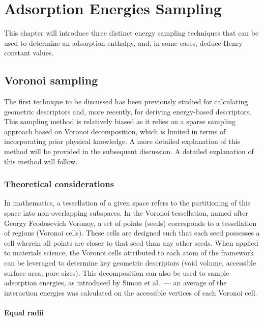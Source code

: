 \documentclass[main]{subfiles}
\begin{document}
\chapter{Adsorption Energies Sampling}
\vspace*{-1\baselineskip}

This chapter will introduce three distinct energy sampling techniques that can be used to determine an adsorption enthalpy, and, in some cases, deduce Henry constant values.

\section{Voronoi sampling}

The first technique to be discussed has been previously studied for calculating geometric descriptors and, more recently, for deriving energy-based descriptors\autocite{Simon_2015}. This sampling method is relatively biased as it relies on a sparse sampling approach based on Voronoi decomposition, which is limited in terms of incorporating prior physical knowledge. A more detailed explanation of this method will be provided in the subsequent discussion. A detailed explanation of this method will follow.

\subsection{Theoretical considerations}

In mathematics, a tessellation of a given space refers to the partitioning of this space into non-overlapping subspaces. In the Voronoi tessellation, named after Georgy Feodosevich Voronoy, a set of points (seeds) corresponds to a tessellation of regions (Voronoi cells). These cells are designed such that each seed possesses a cell wherein all points are closer to that seed than any other seeds.\autocite{Rycroft_2009} When applied to materials science, the Voronoi cells attributed to each atom of the framework can be leveraged to determine key geometric descriptors (void volume, accessible surface area, pore sizes). This decomposition can also be used to sample adsorption energies, as introduced by Simon et al.\ --- an average of the interaction energies was calculated on the accessible vertices of each Voronoi cell.\autocite{Simon_2015}

\subsubsection{Equal radii}
\end{document}

